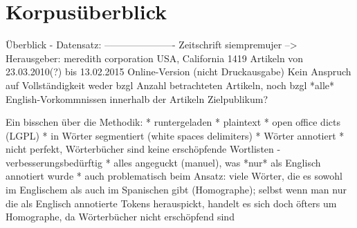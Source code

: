 \section{Korpusüberblick}

Überblick - Datensatz:
----------------------
Zeitschrift siempremujer --> Herausgeber: meredith corporation USA, California
1419 Artikeln von 23.03.2010(?) bis 13.02.2015
Online-Version (nicht Druckausgabe)
Kein Anspruch auf Vollständigkeit weder bzgl Anzahl betrachteten Artikeln, noch bzgl *alle* English-Vorkommnissen innerhalb der Artikeln
Zielpublikum?

Ein bisschen über die Methodik:
* runtergeladen
* plaintext
* open office dicts (LGPL)
* in Wörter segmentiert (white spaces delimiters)
* Wörter annotiert
* nicht perfekt, Wörterbücher sind keine erschöpfende Wortlisten - verbesserungsbedürftig
* alles angeguckt (manuel), was *nur* als Englisch annotiert wurde
* auch problematisch beim Ansatz: viele Wörter, die es sowohl im Englischem als auch im Spanischen gibt (Homographe); selbst wenn man nur die als Englisch annotierte Tokens herauspickt, handelt es sich doch öfters um Homographe, da Wörterbücher nicht erschöpfend sind
